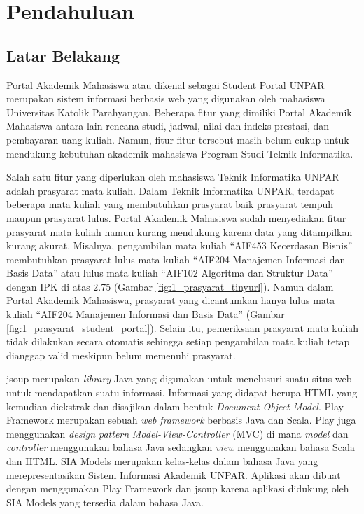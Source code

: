 \chapter{Pendahuluan}
\label{chap:pendahuluan}

\section{Latar Belakang}
\label{sec:latar_belakang}

Portal Akademik Mahasiswa atau dikenal sebagai Student Portal UNPAR\cite{studentportalunpar} merupakan sistem informasi berbasis web yang digunakan oleh mahasiswa Universitas Katolik Parahyangan. Beberapa fitur yang dimiliki Portal Akademik Mahasiswa antara lain rencana studi, jadwal, nilai dan indeks prestasi, dan pembayaran uang kuliah. Namun, fitur-fitur tersebut masih belum cukup untuk mendukung kebutuhan akademik mahasiswa Program Studi Teknik Informatika. 

Salah satu fitur yang diperlukan oleh mahasiswa Teknik Informatika UNPAR adalah prasyarat mata kuliah. Dalam Teknik Informatika UNPAR, terdapat beberapa mata kuliah yang membutuhkan prasyarat baik prasyarat tempuh maupun prasyarat lulus. Portal Akademik Mahasiswa sudah menyediakan fitur prasyarat mata kuliah namun kurang mendukung karena data yang ditampilkan kurang akurat. Misalnya, pengambilan mata kuliah ``AIF453 Kecerdasan Bisnis'' membutuhkan prasyarat lulus mata kuliah ``AIF204 Manajemen Informasi dan Basis Data'' atau lulus mata kuliah ``AIF102 Algoritma dan Struktur Data'' dengan IPK di atas 2.75 (Gambar \ref{fig:1_prasyarat_tinyurl}). Namun dalam Portal Akademik Mahasiswa, prasyarat yang dicantumkan hanya lulus mata kuliah ``AIF204 Manajemen Informasi dan Basis Data'' (Gambar \ref{fig:1_prasyarat_student_portal}). Selain itu, pemeriksaan prasyarat mata kuliah tidak dilakukan secara otomatis sehingga setiap pengambilan mata kuliah tetap dianggap valid meskipun belum memenuhi prasyarat.

jsoup\cite{jsoup} merupakan \textit{library} Java yang digunakan untuk menelusuri suatu situs web untuk mendapatkan suatu informasi. Informasi yang didapat berupa HTML yang kemudian diekstrak dan disajikan dalam bentuk \textit{Document Object Model}. Play Framework\cite{Leroux:2014} merupakan sebuah \textit{web framework} berbasis Java dan Scala. Play juga menggunakan \textit{design pattern} \textit{Model-View-Controller} (MVC) di mana \textit{model} dan \textit{controller} menggunakan bahasa Java sedangkan \textit{view} menggunakan bahasa Scala dan HTML. SIA Models\cite{siamodels} merupakan kelas-kelas dalam bahasa Java yang merepresentasikan Sistem Informasi Akademik UNPAR. Aplikasi akan dibuat dengan menggunakan Play Framework dan jsoup karena aplikasi didukung oleh SIA Models yang tersedia dalam bahasa Java. 

